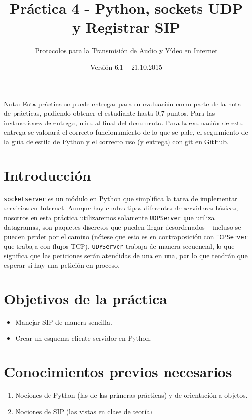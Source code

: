\documentclass[11pt,a4paper]{article}
\begin{document}
\title{Práctica 4 - Python, sockets UDP y Registrar SIP}
\author{Protocolos para la Transmisión de Audio y Vídeo en Internet}
\date{Versión 6.1 – 21.10.2015}


\maketitle

Nota: Esta práctica se puede entregar para su evaluación como parte de la nota de prácticas, pudiendo obtener el estudiante hasta 0,7 puntos. Para las instrucciones de entrega, mira al final del documento. Para la evaluación de esta entrega se valorará el correcto funcionamiento de lo que se pide, el seguimiento de la guía de estilo de Python y el correcto uso (y entrega) con git en GitHub.

\section{Introducción}

\texttt{socketserver} es un módulo en Python que simplifica la tarea de implementar servicios en Internet. Aunque hay cuatro tipos diferentes de servidores básicos, nosotros en esta práctica utilizaremos solamente \texttt{UDPServer} que utiliza datagramas, son paquetes discretos que pueden llegar desordenados – incluso se pueden perder por el camino (nótese que esto es en contraposición con \texttt{TCPServer} que trabaja con flujos TCP). \texttt{UDPServer} trabaja de manera secuencial, lo que significa que las peticiones serán atendidas de una en una, por lo que tendrán que esperar si hay una petición en proceso.

\section{Objetivos de la práctica}

\begin{itemize}
  \item Manejar SIP de manera sencilla.
  \item Crear un esquema cliente-servidor en Python.
\end{itemize}

\section{Conocimientos previos necesarios}

\begin{enumerate}
  \item Nociones de Python (las de las primeras prácticas) y de orientación a objetos.
  \item Nociones de SIP (las vistas en clase de teoría)
\end{enumerate}
\end{document}
